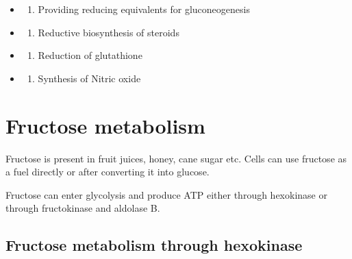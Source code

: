 \documentclass[
]{book}
\providecommand{\tightlist}{%
  \setlength{\itemsep}{0pt}\setlength{\parskip}{0pt}}
\begin{document}
\begin{itemize}
\tightlist
\item
  \begin{enumerate}
  \def\labelenumi{(\Alph{enumi})}
  \tightlist
  \item
    Providing reducing equivalents for gluconeogenesis\\
  \end{enumerate}
\item
  \begin{enumerate}
  \def\labelenumi{(\Alph{enumi})}
  \setcounter{enumi}{1}
  \tightlist
  \item
    Reductive biosynthesis of steroids\\
  \end{enumerate}
\item
  \begin{enumerate}
  \def\labelenumi{(\Alph{enumi})}
  \setcounter{enumi}{2}
  \tightlist
  \item
    Reduction of glutathione\\
  \end{enumerate}
\item
  \begin{enumerate}
  \def\labelenumi{(\Alph{enumi})}
  \setcounter{enumi}{3}
  \tightlist
  \item
    Synthesis of Nitric oxide
  \end{enumerate}
\end{itemize}

\chapter{Fructose metabolism}\label{fructose-metabolism}

Fructose is present in fruit juices, honey, cane sugar etc. Cells can use fructose as a fuel directly or after converting it into glucose.

Fructose can enter glycolysis and produce ATP either through hexokinase or through fructokinase and aldolase B.

\section{Fructose metabolism through hexokinase}\label{fructose-metabolism-through-hexokinase}
\end{document}
